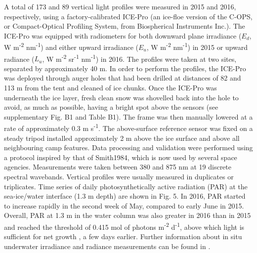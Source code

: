 \documentclass[essd, manuscript]{copernicus}
\begin{document}
A total of 173 and 89 vertical light profiles were measured in 2015 and 2016, respectively, using a factory-calibrated ICE-Pro (an ice-floe version of the C-OPS, or Compact-Optical Profiling System, from Biospherical Instruments Inc.). The ICE-Pro was equipped with radiometers for both downward plane irradiance ($E_d$, W m\textsuperscript{-2} nm\textsuperscript{-1}) and either upward irradiance ($E_u$, W m\textsuperscript{-2} nm\textsuperscript{-1}) in 2015 or upward radiance ($L_u$, W m\textsuperscript{-2} sr\textsuperscript{-1} nm\textsuperscript{-1}) in 2016. The profiles were taken at two sites, separated by approximately 40 m. In order to perform the profiles, the ICE-Pro was deployed through auger holes that had been drilled at distances of 82 and 113  m from the tent and cleaned of ice chunks. Once the ICE-Pro was underneath the ice layer, fresh clean snow was shovelled back into the hole to avoid, as much as possible, having a bright spot above the sensors (see supplementary Fig. B1 and Table B1). The frame was then manually lowered at a rate of approximately 0.3 m s\textsuperscript{-1}. The above-surface reference sensor was fixed on a steady tripod installed approximately 2 m above the ice surface and above all neighbouring camp features. Data processing and validation were performed using a protocol inspired by that of Smith1984, which is now used by several space agencies. Measurements were taken between 380 and 875 nm at 19 discrete spectral wavebands. Vertical profiles were usually measured in duplicates or triplicates. Time series of daily photosynthetically active radiation (PAR) at the sea-ice/water interface (1.3 m depth) are shown in Fig. 5. In 2016, PAR started to increase rapidly in the second week of May, compared to early June in 2015. Overall, PAR at 1.3 m in the water column was also greater in 2016 than in 2015 and reached the threshold of 0.415 mol of photons m\textsuperscript{-2} d\textsuperscript{-1}, above which light is sufficient for net growth \citep{Letelier2004}, a few days earlier. Further information about in situ underwater irradiance and radiance measurements can be found in \citet{Massicotte2018}. 
\end{document}
